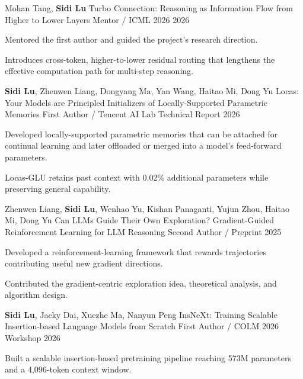 \newpage
{}

\begin{cventries}
  \cventry
    {Mohan Tang, \textbf{Sidi Lu}}
    {Turbo Connection: Reasoning as Information Flow from Higher to Lower Layers}
    {Mentor / ICML 2026}
    {2026}
    {
      \begin{cvitems}
        \item {Mentored the first author and guided the project's research direction.}
        \item {Introduces cross-token, higher-to-lower residual routing that lengthens the effective computation path for multi-step reasoning.}
      \end{cvitems}
    }

  \cventry
    {\textbf{Sidi Lu}, Zhenwen Liang, Dongyang Ma, Yan Wang, Haitao Mi, Dong Yu}
    {Locas: Your Models are Principled Initializers of Locally-Supported Parametric Memories}
    {First Author / Tencent AI Lab Technical Report}
    {2026}
    {
      \begin{cvitems}
        \item {Developed locally-supported parametric memories that can be attached for continual learning and later offloaded or merged into a model's feed-forward parameters.}
        \item {Locas-GLU retains past context with 0.02\% additional parameters while preserving general capability.}
      \end{cvitems}
    }

  \cventry
    {Zhenwen Liang, \textbf{Sidi Lu}, Wenhao Yu, Kishan Panaganti, Yujun Zhou, Haitao Mi, Dong Yu}
    {Can LLMs Guide Their Own Exploration? Gradient-Guided Reinforcement Learning for LLM Reasoning}
    {Second Author / Preprint}
    {2025}
    {
      \begin{cvitems}
        \item {Developed a reinforcement-learning framework that rewards trajectories contributing useful new gradient directions.}
        \item {Contributed the gradient-centric exploration idea, theoretical analysis, and algorithm design.}
      \end{cvitems}
    }

  \cventry
    {\textbf{Sidi Lu}, Jacky Dai, Xuezhe Ma, Nanyun Peng}
    {InsNeXt: Training Scalable Insertion-based Language Models from Scratch}
    {First Author / COLM 2026 Workshop}
    {2026}
    {
      \begin{cvitems}
        \item {Built a scalable insertion-based pretraining pipeline reaching 573M parameters and a 4,096-token context window.}
      \end{cvitems}
    }


\end{cventries}
